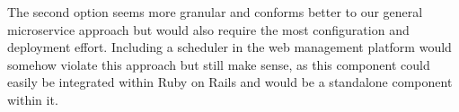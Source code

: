 The second option seems more granular and conforms better to our general
microservice approach but would also require the most configuration and
deployment effort. Including a scheduler in the web management platform
would somehow violate this approach but still make sense, as this
component could easily be integrated within Ruby on Rails and would be a
standalone component within it.
